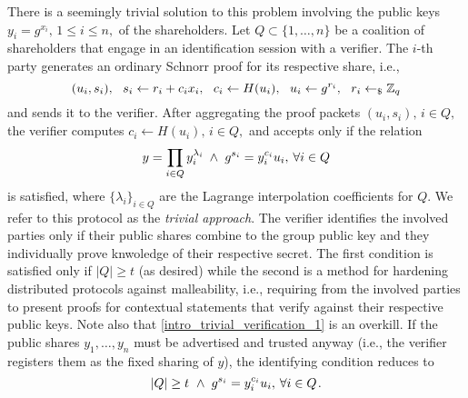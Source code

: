 \documentclass{iacrtrans}
\begin{document}
There is a seemingly trivial solution to this problem
involving the public keys
$y_i = g ^ {x_i},\hspace{2pt} 1 \le i \le n,$
of the shareholders.
Let $Q \subset \{1, \dots, n\}$
be a coalition of shareholders that engage in
an identification session with a verifier.
The $i$-th party generates
an ordinary Schnorr proof
for its respective share, i.e.,
\vspace{5pt}
\begin{equation*}
(u_i, s_i),
\ \ s_i \leftarrow r_i + c_i x_i,
\ \ c_i \leftarrow H(u_i),
\ \ u_i \leftarrow g ^ {r_i},
\ \ r_i \leftarrow_\$ \mathbb{Z}_q
\vspace{5pt}
\end{equation*}
and sends it to the verifier.
After aggregating the proof packets
$(u_i, s_i),\hspace{2pt}i \in Q,$
the verifier computes
$c_i \leftarrow H(u_i),\hspace{2pt} i \in Q,$
and accepts only if the relation
\vspace{5pt}
\begin{equation}\label{intro_trivial_verification_1}
y = \prod_{i \in Q} y_i ^{\lambda_i}
\hspace{2.50pt}
\land
\hspace{3pt}
g ^ {s_i} = y_i ^ {c_i} u_i,
\hspace{2pt}
\forall i \in Q
\vspace{5pt}
\end{equation}
is satisfied, where $\{\lambda_i\}_{i \in Q}$ are the
Lagrange interpolation coefficients for $Q$.
We refer to this protocol as the \textit{trivial approach}.
The verifier identifies the involved parties only if
their public shares combine to the group public key
and they individually prove knwoledge of their respective secret.
The first condition is satisfied only if $|Q| \ge t$ (as desired)
while the second is a method for hardening
distributed protocols against malleability, i.e.,
requiring from the involved parties
to present proofs for contextual statements
that verify against their respective public keys.
Note also that \eqref{intro_trivial_verification_1} is an overkill.
If the public shares $y_1, \dots, y_n$
must be advertised and trusted anyway
(i.e., the verifier registers them as the fixed sharing of $y$),
the identifying condition reduces to
\vspace{5pt}
\begin{equation}\label{intro_trivial_verification_2}
|Q| \ge t
\hspace{3.50pt}
\land
\hspace{3pt}
g ^ {s_i} = y_i ^ {c_i} u_i,
\hspace{2pt}
\forall i \in Q
\hspace{1pt}.
\vspace{5pt}
\end{equation}
\end{document}

